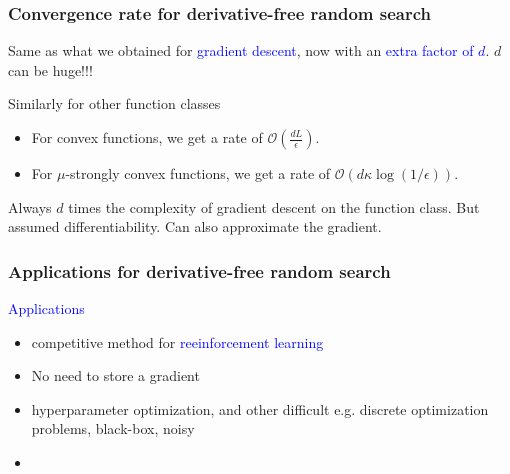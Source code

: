 \documentclass[aspectratio=149]{beamer}
\begin{document}
\begin{frame}
  \frametitle{Convergence rate for derivative-free random search}
  Same as what we obtained for \textcolor{blue}{gradient descent},
  now with an \textcolor{blue}{extra factor of $d$}. $d$ can be huge!!!

  Similarly for other function classes
  \begin{itemize}
    \item For convex functions, we get a rate of $\mathcal{O}(\frac{d L}{\epsilon})$.
    \item For $\mu$-strongly convex functions, we get a rate of $\mathcal{O}(d \kappa \log(1/\epsilon))$.
  \end{itemize}
  Always $d$ times the complexity of gradient descent on the function class.
  But assumed differentiability. Can also approximate the gradient.

\end{frame}

\begin{frame}
  \frametitle{Applications for derivative-free random search}

  \textcolor{blue}{Applications}
  \begin{itemize}
    \item competitive method for \textcolor{blue}{reeinforcement learning}
    \item No need to store a gradient
    \item hyperparameter optimization, and other difficult e.g. discrete optimization
problems, black-box, noisy
    \item
  \end{itemize}

\end{frame}
\end{document}
